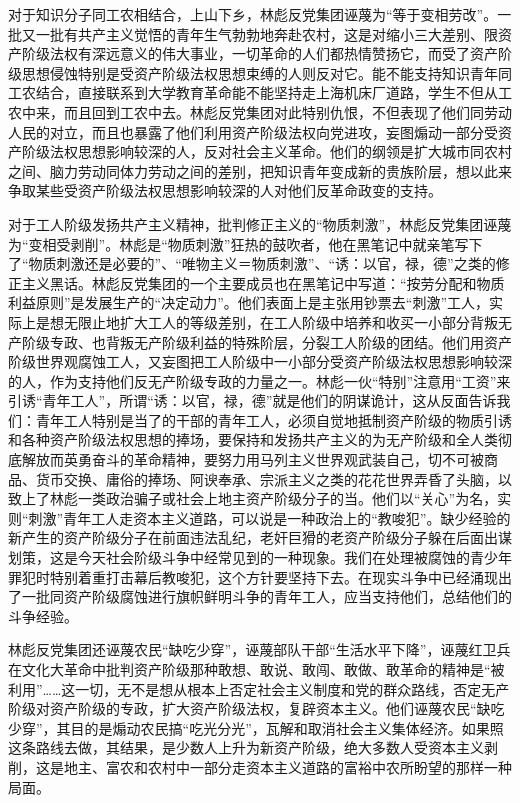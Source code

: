\begin{maonote}
对于知识分子同工农相结合，上山下乡，林彪反党集团诬蔑为“等于变相劳改”。一批又一批有共产主义觉悟的青年生气勃勃地奔赴农村，这是对缩小三大差别、限资产阶级法权有深远意义的伟大事业，一切革命的人们都热情赞扬它，而受了资产阶级思想侵蚀特别是受资产阶级法权思想束缚的人则反对它。能不能支持知识青年同工农结合，直接联系到大学教育革命能不能坚持走上海机床厂道路，学生不但从工农中来，而且回到工农中去。林彪反党集团对此特别仇恨，不但表现了他们同劳动人民的对立，而且也暴露了他们利用资产阶级法权向党进攻，妄图煽动一部分受资产阶级法权思想影响较深的人，反对社会主义革命。他们的纲领是扩大城市同农村之间、脑力劳动同体力劳动之间的差别，把知识青年变成新的贵族阶层，想以此来争取某些受资产阶级法权思想影响较深的人对他们反革命政变的支持。

对于工人阶级发扬共产主义精神，批判修正主义的“物质刺激”，林彪反党集团诬蔑为“变相受剥削”。林彪是“物质刺激”狂热的鼓吹者，他在黑笔记中就亲笔写下了“物质刺激还是必要的”、“唯物主义＝物质刺激”、“诱：以官，禄，德”之类的修正主义黑话。林彪反党集团的一个主要成员也在黑笔记中写道：“按劳分配和物质利益原则”是发展生产的“决定动力”。他们表面上是主张用钞票去“刺激”工人，实际上是想无限止地扩大工人的等级差别，在工人阶级中培养和收买一小部分背叛无产阶级专政、也背叛无产阶级利益的特殊阶层，分裂工人阶级的团结。他们用资产阶级世界观腐蚀工人，又妄图把工人阶级中一小部分受资产阶级法权思想影响较深的人，作为支持他们反无产阶级专政的力量之一。林彪一伙“特别”注意用“工资”来引诱“青年工人”，所谓“诱：以官，禄，德”就是他们的阴谋诡计，这从反面告诉我们：青年工人特别是当了的干部的青年工人，必须自觉地抵制资产阶级的物质引诱和各种资产阶级法权思想的捧场，要保持和发扬共产主义的为无产阶级和全人类彻底解放而英勇奋斗的革命精神，要努力用马列主义世界观武装自己，切不可被商品、货币交换、庸俗的捧场、阿谀奉承、宗派主义之类的花花世界弄昏了头脑，以致上了林彪一类政治骗子或社会上地主资产阶级分子的当。他们以“关心”为名，实则“刺激”青年工人走资本主义道路，可以说是一种政治上的“教唆犯”。缺少经验的新产生的资产阶级分子在前面违法乱纪，老奸巨猾的老资产阶级分子躲在后面出谋划策，这是今天社会阶级斗争中经常见到的一种现象。我们在处理被腐蚀的青少年罪犯时特别着重打击幕后教唆犯，这个方针要坚持下去。在现实斗争中已经涌现出了一批同资产阶级腐蚀进行旗帜鲜明斗争的青年工人，应当支持他们，总结他们的斗争经验。

林彪反党集团还诬蔑农民“缺吃少穿”，诬蔑部队干部“生活水平下降”，诬蔑红卫兵在文化大革命中批判资产阶级那种敢想、敢说、敢闯、敢做、敢革命的精神是“被利用”……这一切，无不是想从根本上否定社会主义制度和党的群众路线，否定无产阶级对资产阶级的专政，扩大资产阶级法权，复辟资本主义。他们诬蔑农民“缺吃少穿”，其目的是煽动农民搞“吃光分光”，瓦解和取消社会主义集体经济。如果照这条路线去做，其结果，是少数人上升为新资产阶级，绝大多数人受资本主义剥削，这是地主、富农和农村中一部分走资本主义道路的富裕中农所盼望的那样一种局面。


\end{maonote}

